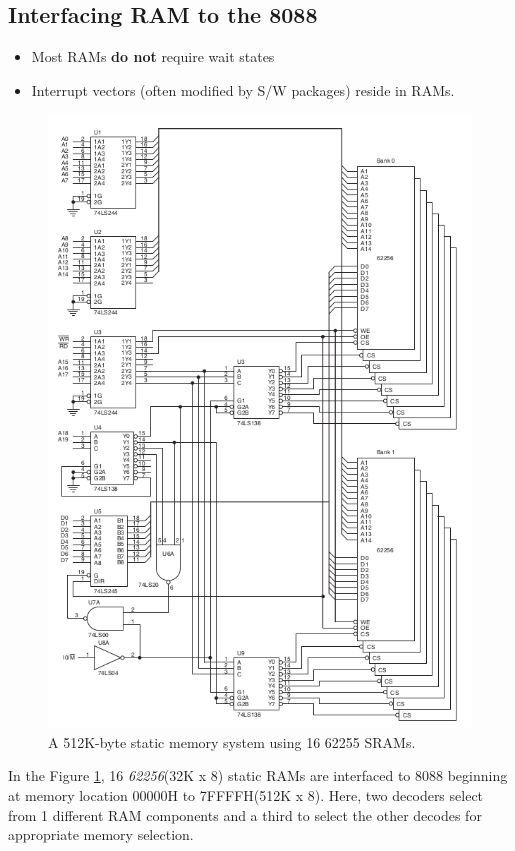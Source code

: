 \subsection{Interfacing RAM to the 8088}
\begin{itemize}
  \item Most RAMs \textbf{do not} require wait states
  \item Interrupt vectors (often modified by S/W packages) reside in RAMs.

\end{itemize}
\begin{figure}[h!]
  \includegraphics[width = 1\textwidth]{./figures/RAM.png}
  \caption{A 512K-byte static memory system using 16 62255 SRAMs.}
  \label{fig:ram}
\end{figure}
In the Figure \ref{fig:ram}, 16 \textit{62256}(32K x 8) static RAMs are interfaced to 8088 beginning at memory location 00000H to 7FFFFH(512K x 8). Here, two decoders select from 1 different RAM components and a third to select the other decodes for appropriate memory selection.
